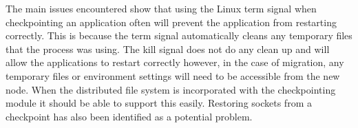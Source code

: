The main issues encountered show that using the Linux term signal when checkpointing an application often will prevent the application from restarting correctly. This is because the term signal automatically cleans any temporary files that the process was using. The kill signal does not do any clean up and will allow the applications to restart correctly however, in the case of migration, any temporary files or environment settings will need to be accessible from the new node. When the distributed file system is incorporated with the checkpointing module it should be able to support this easily. Restoring sockets from a checkpoint has also been identified as a potential problem.

